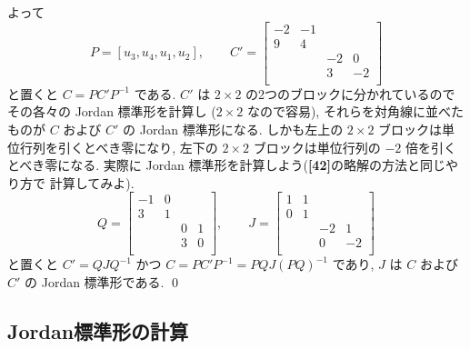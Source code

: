 \documentclass[12pt,twoside]{jarticle}
\begin{document}
\begin{example}
  よって
  \begin{equation*}
    P = [u_3,u_4,u_1,u_2], \qquad
    C' = 
    \begin{bmatrix}
      -2 & -1 &    &    \\
       9 &  4 &    &    \\
         &    & -2 &  0 \\
         &    &  3 & -2 \\
    \end{bmatrix}
  \end{equation*}
  と置くと $C=PC'P^{-1}$ である. 
  $C'$ は $2\times 2$ の2つのブロックに分かれているので
  その各々の Jordan 標準形を計算し ($2\times 2$ なので容易), 
  それらを対角線に並べたものが $C$ および $C'$ の Jordan 標準形になる.
  しかも左上の $2\times 2$ ブロックは単位行列を引くとべき零になり,
  左下の $2\times 2$ ブロックは単位行列の $-2$ 倍を引くとべき零になる.
  実際に Jordan 標準形を計算しよう({\bf[42]}の略解の方法と同じやり方で
  計算してみよ).
  \begin{equation*}
    Q = 
    \begin{bmatrix}
      -1 & 0 &   &   \\
       3 & 1 &   &   \\
         &   & 0 & 1 \\
         &   & 3 & 0 \\
    \end{bmatrix},
    \qquad
    J =
    \begin{bmatrix}
      1 & 1 &    &    \\
      0 & 1 &    &    \\
        &   & -2 &  1 \\
        &   &  0 & -2 \\
    \end{bmatrix}
  \end{equation*}
  と置くと $C' = QJQ^{-1}$ かつ $C=PC'P^{-1}=PQJ(PQ)^{-1}$ であり, 
  $J$ は $C$ および $C'$ の Jordan 標準形である.
  \qed
\end{example}


\subsection{Jordan標準形の計算}
\end{document}
